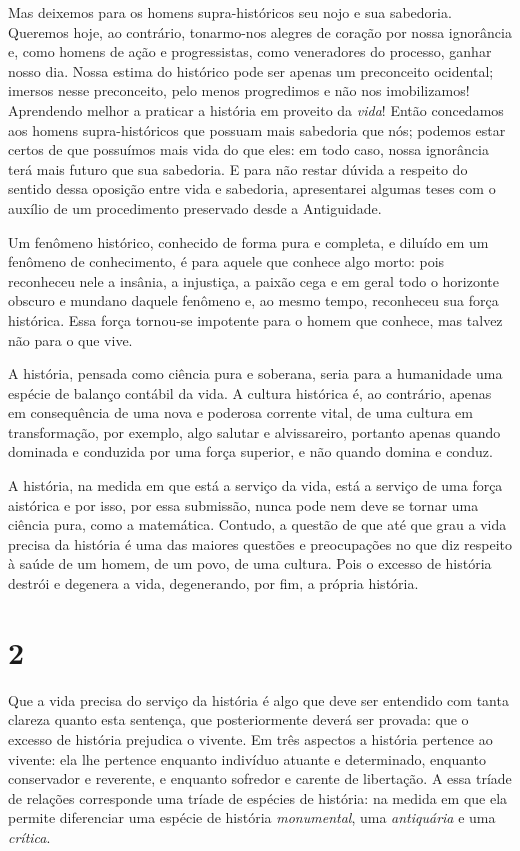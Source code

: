 Mas deixemos para os homens supra-históricos seu nojo e sua sabedoria.
Queremos hoje, ao contrário, tonarmo-nos alegres de coração por nossa
ignorância e, como homens de ação e progressistas, como veneradores do
processo, ganhar nosso dia. Nossa estima do histórico pode ser apenas um
preconceito ocidental; imersos nesse preconceito, pelo menos progredimos
e não nos imobilizamos! Aprendendo melhor a praticar a história em
proveito da \emph{vida}! Então concedamos aos homens supra-históricos
que possuam mais sabedoria que nós; podemos estar certos de que
possuímos mais vida do que eles: em todo caso, nossa ignorância terá
mais futuro que sua sabedoria. E para não restar dúvida a respeito do
sentido dessa oposição entre vida e sabedoria, apresentarei algumas
teses com o auxílio de um procedimento preservado desde a Antiguidade.

Um fenômeno histórico, conhecido de forma pura e completa, e diluído em
um fenômeno de conhecimento, é para aquele que conhece algo morto: pois
reconheceu nele a insânia, a injustiça, a paixão cega e em geral todo o
horizonte obscuro e mundano daquele fenômeno e, ao mesmo tempo,
reconheceu sua força histórica. Essa força tornou-se impotente para o
homem que conhece, mas talvez não para o que vive.

A história, pensada como ciência pura e soberana, seria para a
humanidade uma espécie de balanço contábil da vida. A cultura histórica
é, ao contrário, apenas em consequência de uma nova e poderosa corrente
vital, de uma cultura em transformação, por exemplo, algo salutar e
alvissareiro, portanto apenas quando dominada e conduzida por uma força
superior, e não quando domina e conduz.

A história, na medida em que está a serviço da vida, está a serviço de
uma força aistórica e por isso, por essa submissão, nunca pode nem deve
se tornar uma ciência pura, como a matemática. Contudo, a questão de que
até que grau a vida precisa da história é uma das maiores questões e
preocupações no que diz respeito à saúde de um homem, de um povo, de uma
cultura. Pois o excesso de história destrói e degenera a vida,
degenerando, por fim, a própria história.

\chapter{2}\label{capuxedtulo-2}

Que a vida precisa do serviço da história é algo que deve ser entendido
com tanta clareza quanto esta sentença, que posteriormente deverá ser
provada: que o excesso de história prejudica o vivente. Em três
aspectos a história pertence ao vivente: ela lhe pertence enquanto
indivíduo atuante e determinado, enquanto conservador e reverente, e
enquanto sofredor e carente de libertação. A essa tríade de relações
corresponde uma tríade de espécies de história: na medida em que ela
permite diferenciar uma espécie de história \emph{monumental}, uma
\emph{antiquária} e uma \emph{crítica}.

